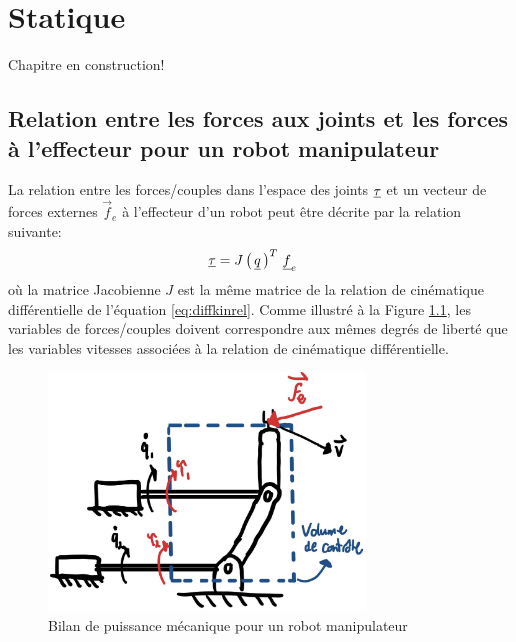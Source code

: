 \chapter{Statique}
\label{sec:static}

Chapitre en construction!

\section{Relation entre les forces aux joints et les forces à l'effecteur pour un robot manipulateur}
\label{sec:manipstatic}

La relation entre les forces/couples dans l'espace des joints $\underline{\tau}$ et un vecteur de forces externes $\vec{f}_e$ à l'effecteur d'un robot peut être décrite par la relation suivante:
\begin{align}
	\underline{\tau} &= J\left( \, \underline{q} \, \right)^T \, \underline{f}_e
	\label{eq:staticmanipulator}
\end{align}
où la matrice Jacobienne $J$ est la même matrice de la relation de cinématique différentielle de l'équation \ref{eq:diffkinrel}. Comme illustré à la Figure \ref{fig:controlvolume}, les variables de forces/couples doivent correspondre aux mêmes degrés de liberté que les variables vitesses associées à la relation de cinématique différentielle.
\begin{figure}[H]
	\centering
	\includegraphics[width=0.75\textwidth]{fig/controlvolume.jpg}
	\caption{Bilan de puissance mécanique pour un robot manipulateur}
	\label{fig:controlvolume}
\end{figure}

